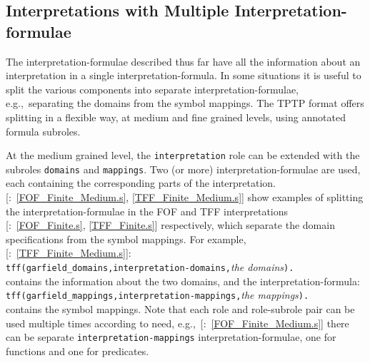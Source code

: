 \documentclass{easychair}
\newcommand{\smalltt}[1]{\small \texttt{#1}}
\newcommand{\example}{{\scriptsize \faFile[regular]}}
\begin{document}
\subsection{Interpretations with Multiple Interpretation-formulae}
\label{NewTarskianSplit}

The interpretation-formulae described thus far have all the information about an interpretation 
in a single interpretation-formula.
In some situations it is useful to split the various components into separate 
interpretation-formulae, e.g.,~separating the domains from the symbol mappings.
The TPTP format offers splitting in a flexible way, at medium and fine grained levels, using 
annotated formula subroles.

At the medium grained level, the \smalltt{interpretation} role can be extended with the subroles
\smalltt{domains} and \smalltt{mappings}.
Two (or more) interpretation-formulae are used, each containing the corresponding parts of the 
interpretation.
[\example{}:~\ref{FOF_Finite_Medium.s}, \ref{TFF_Finite_Medium.s}]
show examples of splitting the interpretation-formulae in the FOF and TFF 
interpretations [\example{}:~\ref{FOF_Finite.s}, \ref{TFF_Finite.s}] 
respectively, which separate the domain specifications from the symbol mappings.
For example, [\example{}:~\ref{TFF_Finite_Medium.s}]:\\
\hspace*{0.5cm}\smalltt{tff(garfield\_domains,interpretation-domains,}\emph{the domains}\smalltt{).} \\
contains the information about the two domains, and the interpretation-formula: \\
\hspace*{0.5cm}\smalltt{tff(garfield\_mappings,interpretation-mappings,}\emph{the mappings}\smalltt{).} \\
contains the symbol mappings.
Note that each role and role-subrole pair can be used multiple times according to need, 
e.g.,~[\example{}:~\ref{FOF_Finite_Medium.s}] there can be separate
\smalltt{interpretation-mappings} interpretation-formulae, one for functions and one for 
predicates.
\end{document}
